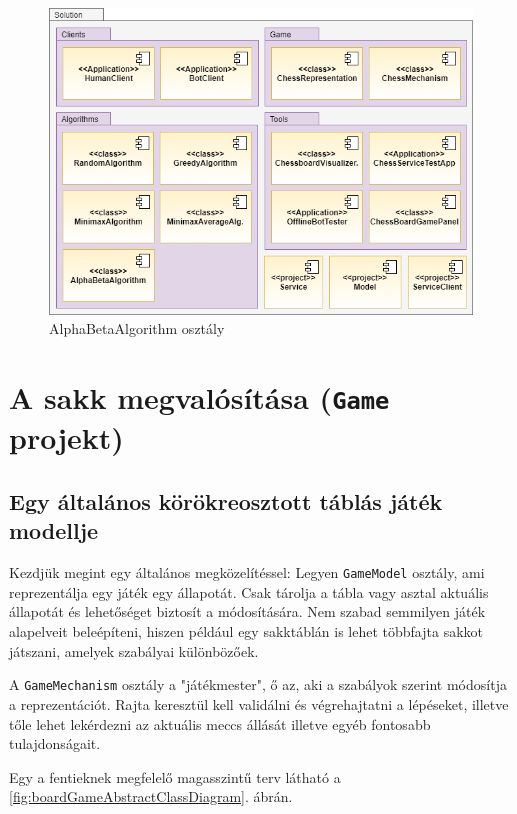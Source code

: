 \documentclass[twoside, a4paper, 12pt]{book}
\begin{document}
\begin{figure}[htbp]
	\centering
	\includegraphics[width=1.0\textwidth]{img/solutionStructure.png}
	\caption{AlphaBetaAlgorithm osztály}
	\label{fig:solutionStructure}
\end{figure}

\section{A sakk megvalósítása (\texttt{Game} projekt)}
\subsection{Egy általános körökreosztott táblás játék modellje}
Kezdjük megint egy általános megközelítéssel: Legyen \texttt{GameModel} osztály, ami reprezentálja egy játék egy állapotát. Csak tárolja a tábla vagy asztal aktuális állapotát és lehetőséget biztosít a módosítására. Nem szabad semmilyen játék alapelveit beleépíteni, hiszen például egy sakktáblán is lehet többfajta sakkot játszani, amelyek szabályai különbözőek.

A \texttt{GameMechanism} osztály a "játékmester", ő az, aki a szabályok szerint módosítja a reprezentációt. Rajta keresztül kell validálni és végrehajtatni a lépéseket, illetve tőle lehet lekérdezni az aktuális meccs állását illetve egyéb fontosabb tulajdonságait. 

Egy a fentieknek megfelelő magasszintű terv látható a \ref{fig:boardGameAbstractClassDiagram}. ábrán.
\end{document}

